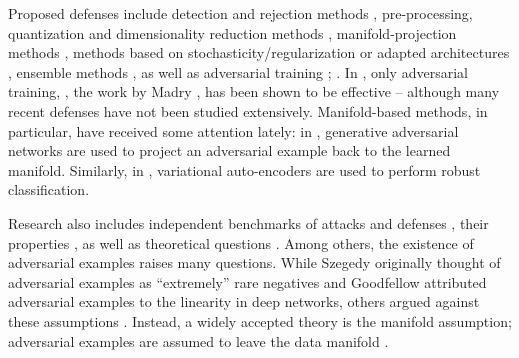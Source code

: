  Proposed defenses include detection and rejection methods \cite{GrosseARXIV2017,FeinmanARXIV2017,LiaoCVPR2018,MaARXIV2018,AmsalegWIFS2017,MetzenARXIV2017}, pre-processing, quantization and dimensionality reduction methods \cite{BuckmanICLR2018,PrakashDCC2018,BhagojiARXIV2017}, manifold-projection methods \cite{IlyasARXIV2017,SamangoueiICLR2018,SchottARXIV2018,ShenARXIV2017}, methods based on stochasticity/regularization or adapted architectures \cite{ZantedschiAISEC2017,BhagojiARXIV2017,NayebiARXIV2017,SimonGabrielARXIV2018,HeinNIPS2017,JakubovitzARXIV2018,RossAAAI2018,KannanARXIV2018,LambARXIV2018,XieICLR2018}, ensemble methods \cite{LiuARXIV2017,StraussARXIV2017,HeUSENIXWORK2017,TramerICLR2018}, as well as adversarial training \cite{ZantedschiAISEC2017,MiyatoICLR2016,HuangARXIV2015,ShahamNEUROCOMPUTING2018,SinhaICLR2018,LeeARXIV2017b,MadryICLR2018}; . In \cite{AthalyeARXIV2018}, only adversarial training, \eg, the work by Madry \etal \cite{MadryICLR2018}, has been shown to be effective -- although many recent defenses have not been studied extensively. Manifold-based methods, in particular, have received some attention lately: in \cite{IlyasARXIV2017,SamangoueiICLR2018}, generative adversarial networks \cite{GoodfellowNIPS2014} are used to project an adversarial example back to the learned manifold. Similarly, in \cite{SchottARXIV2018}, variational auto-encoders \cite{KingmaICLR2014} are used to perform robust classification.

 Research also includes independent benchmarks of attacks and defenses \cite{CarliniAISec2017,CarliniARXIV2016,AthalyeARXIV2018b,AthalyeARXIV2018,SharmaARXIV2017}, their properties \cite{LiuICLR2017,SharifARXIV2018}, as well as theoretical questions \cite{HeinNIPS2017,JakubovitzARXIV2018,FawziICMLWORK2015,TanayARXIV2016,GilmerICLRWORK2018,SimonGabrielARXIV2018,TsiprasARXIV2018,WangICML2018}. Among others, the existence of adversarial examples \cite{SzegedyARXIV2013,GoodfellowARXIV2014,TanayARXIV2016} raises many questions. While Szegedy \etal \cite{SzegedyARXIV2013} originally thought of adversarial examples as ``extremely'' rare negatives and Goodfellow \etal \cite{GoodfellowARXIV2014} attributed adversarial examples to the linearity in deep networks, others argued against these assumptions \cite{GilmerICLRWORK2018,TanayARXIV2016}. Instead, a widely accepted theory is the manifold assumption; adversarial examples are assumed to leave the data manifold \cite{GilmerICLRWORK2018,TanayARXIV2016,IlyasARXIV2017,SamangoueiICLR2018,SchottARXIV2018}.

